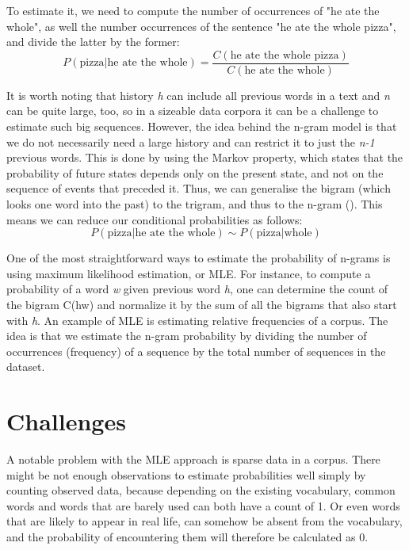 To estimate it, we need to compute the number of occurrences of "he ate the whole", as well the number occurrences of the sentence "he ate the whole pizza", and divide the latter by the former:
\begin{equation}
    P(\text{pizza}|\text{he ate the whole})=\frac{C(\text{he ate the whole pizza})}{C(\text{he ate the whole})}
\end{equation}

It is worth noting that history \textit{h} can include all previous words in a text and \textit{n} can be quite large, too, so in a sizeable data corpora it can be a challenge to estimate such big sequences. However, the idea behind the n-gram model is that we do not necessarily need a large history and can restrict it to just the \textit{n-1} previous words. This is done by using the Markov property, which states that the probability of future states depends only on the present state, and not on the sequence of events that preceded it. Thus, we can generalise the bigram (which looks one word into the past) to the trigram, and thus to the n-gram (\cite{Jura09a}). This means we can reduce our conditional probabilities as follows:
\begin{equation}
    P(\text{pizza}|\text{he ate the whole}) \sim P(\text{pizza}|\text{whole})
\end{equation}

One of the most straightforward ways to estimate the probability of n-grams is using maximum likelihood estimation, or MLE. For instance, to compute a probability of a word \textit{w} given previous word \textit{h}, one can determine the count of the bigram C(hw) and normalize it by the sum of all the bigrams that also start with \textit{h}. An example of MLE is estimating relative frequencies of a corpus. The idea is that we estimate the n-gram probability by dividing the number of occurrences (frequency) of a sequence by the total number of sequences in the dataset.  

\section{Challenges}
\label{sec:NgramBackground-Challenges}
A notable problem with the MLE approach is sparse data in a corpus. There might be not enough observations to estimate probabilities well simply by counting observed data, because depending on the existing vocabulary, common words and words that are barely used can both have a count of 1. Or even words that are likely to appear in real life, can somehow be absent from the vocabulary, and the probability of encountering them will therefore be calculated as 0.

